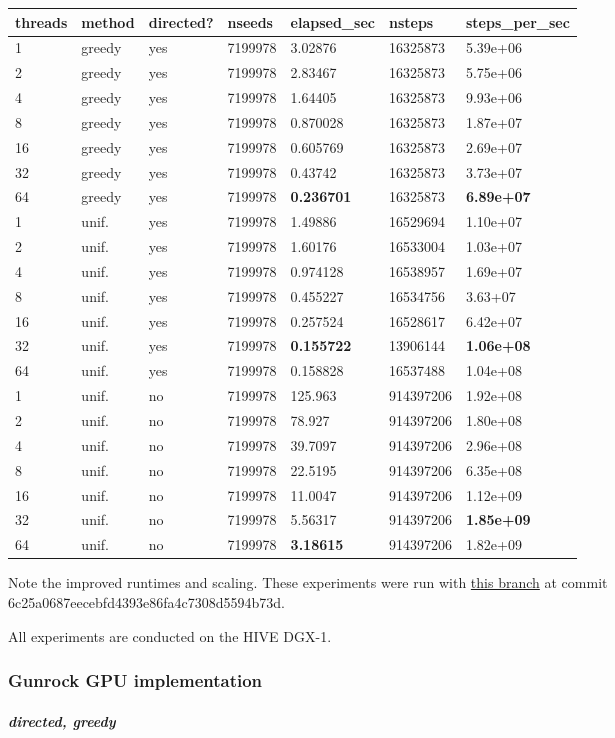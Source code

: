 \documentclass[10pt,oneside]{memoir}
\let\oldsubparagraph\subparagraph
\renewcommand{\subparagraph}[1]{\oldsubparagraph{#1}\mbox{}}
\begin{document}
\begin{longtable}[]{@{}lllllll@{}}
\toprule
threads & method & directed? & nseeds & elapsed\_sec & nsteps &
steps\_per\_sec\tabularnewline
\midrule
\endhead
1 & greedy & yes & 7199978 & 3.02876 & 16325873 &
5.39e+06\tabularnewline
2 & greedy & yes & 7199978 & 2.83467 & 16325873 &
5.75e+06\tabularnewline
4 & greedy & yes & 7199978 & 1.64405 & 16325873 &
9.93e+06\tabularnewline
8 & greedy & yes & 7199978 & 0.870028 & 16325873 &
1.87e+07\tabularnewline
16 & greedy & yes & 7199978 & 0.605769 & 16325873 &
2.69e+07\tabularnewline
32 & greedy & yes & 7199978 & 0.43742 & 16325873 &
3.73e+07\tabularnewline
64 & greedy & yes & 7199978 & \textbf{0.236701} & 16325873 &
\textbf{6.89e+07}\tabularnewline
1 & unif. & yes & 7199978 & 1.49886 & 16529694 & 1.10e+07\tabularnewline
2 & unif. & yes & 7199978 & 1.60176 & 16533004 & 1.03e+07\tabularnewline
4 & unif. & yes & 7199978 & 0.974128 & 16538957 &
1.69e+07\tabularnewline
8 & unif. & yes & 7199978 & 0.455227 & 16534756 & 3.63+07\tabularnewline
16 & unif. & yes & 7199978 & 0.257524 & 16528617 &
6.42e+07\tabularnewline
32 & unif. & yes & 7199978 & \textbf{0.155722} & 13906144 &
\textbf{1.06e+08}\tabularnewline
64 & unif. & yes & 7199978 & 0.158828 & 16537488 &
1.04e+08\tabularnewline
1 & unif. & no & 7199978 & 125.963 & 914397206 & 1.92e+08\tabularnewline
2 & unif. & no & 7199978 & 78.927 & 914397206 & 1.80e+08\tabularnewline
4 & unif. & no & 7199978 & 39.7097 & 914397206 & 2.96e+08\tabularnewline
8 & unif. & no & 7199978 & 22.5195 & 914397206 & 6.35e+08\tabularnewline
16 & unif. & no & 7199978 & 11.0047 & 914397206 &
1.12e+09\tabularnewline
32 & unif. & no & 7199978 & 5.56317 & 914397206 &
\textbf{1.85e+09}\tabularnewline
64 & unif. & no & 7199978 & \textbf{3.18615} & 914397206 &
1.82e+09\tabularnewline
\bottomrule
\end{longtable}

Note the improved runtimes and scaling. These experiments were run with
\href{https://gitlab.hiveprogram.com/bjohnson/graphsearch/tree/gunrock_test}{this
branch} at commit 6c25a0687eecebfd4393e86fa4c7308d5594b73d.

All experiments are conducted on the HIVE DGX-1.

\hypertarget{gunrock-gpu-implementation}{%
\subsubsection{Gunrock GPU
implementation}\label{gunrock-gpu-implementation}}

\hypertarget{directed-greedy}{%
\subparagraph{directed, greedy}\label{directed-greedy}}
\end{document}
